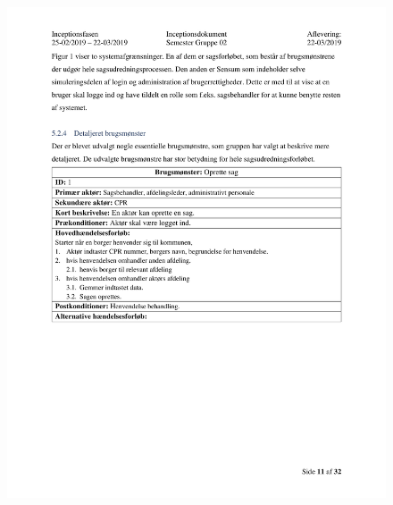 \begin{figure}[hb]
  \includegraphics[scale = 0.33]{./PNG/Inceptions/Gruppe 02 + InceptionsDokument-12.jpg} 
\end{figure}

